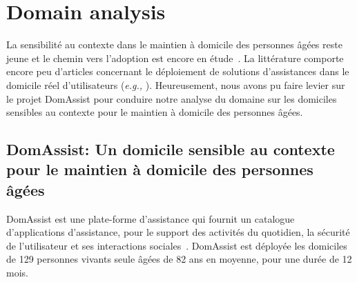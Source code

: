 






\section{Domain analysis}
La sensibilité au contexte dans le maintien à domicile des personnes âgées reste jeune et le chemin vers l'adoption est encore en étude~\cite{kaye2017making}. La littérature comporte encore peu d'articles concernant le déploiement de solutions d'assistances dans le domicile réel d'utilisateurs ({\em e.g.,} \cite{kaye2011intelligent}). Heureusement, nous avons pu faire levier sur le projet DomAssist pour conduire notre analyse du domaine sur les domiciles sensibles au contexte pour le maintien à domicile des personnes âgées.

\subsection{DomAssist: Un domicile sensible au contexte pour le maintien à domicile des personnes âgées}

DomAssist est une plate-forme d'assistance qui fournit un catalogue d'applications d'assistance, pour le support des activités du quotidien, la sécurité de l'utilisateur et ses interactions sociales~\cite{consel2017homeassist}. DomAssist est déployée les domiciles de 129 personnes vivants seule âgées de 82 ans en moyenne, pour une durée de 12 mois.


